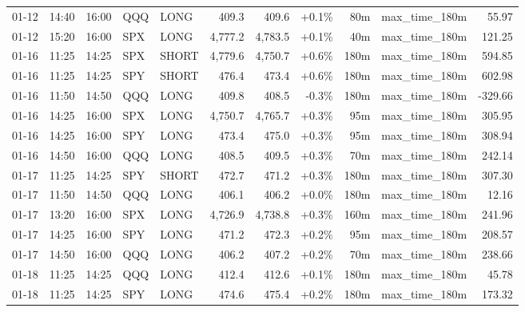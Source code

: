 \documentclass[11pt,a4paper,twoside]{article}
\begin{document}
\begin{center}
\begin{longtable}{>{\color{txtmain}}l l l l l r r r r >{\color{txtmain}}l r}
01-12 & 14:40 & 16:00 & QQQ & LONG & 409.3 & 409.6 & \textcolor{wingreen}{+0.1\%} & 80m & max\_time\_180m & \textcolor{wingreen}{55.97} \\
01-12 & 15:20 & 16:00 & SPX & LONG & 4,777.2 & 4,783.5 & \textcolor{wingreen}{+0.1\%} & 40m & max\_time\_180m & \textcolor{wingreen}{121.25} \\
01-16 & 11:25 & 14:25 & SPX & SHORT & 4,779.6 & 4,750.7 & \textcolor{wingreen}{+0.6\%} & 180m & max\_time\_180m & \textcolor{wingreen}{594.85} \\
01-16 & 11:25 & 14:25 & SPY & SHORT & 476.4 & 473.4 & \textcolor{wingreen}{+0.6\%} & 180m & max\_time\_180m & \textcolor{wingreen}{602.98} \\
01-16 & 11:50 & 14:50 & QQQ & LONG & 409.8 & 408.5 & \textcolor{lossred}{-0.3\%} & 180m & max\_time\_180m & \textcolor{lossred}{-329.66} \\
01-16 & 14:25 & 16:00 & SPX & LONG & 4,750.7 & 4,765.7 & \textcolor{wingreen}{+0.3\%} & 95m & max\_time\_180m & \textcolor{wingreen}{305.95} \\
01-16 & 14:25 & 16:00 & SPY & LONG & 473.4 & 475.0 & \textcolor{wingreen}{+0.3\%} & 95m & max\_time\_180m & \textcolor{wingreen}{308.94} \\
01-16 & 14:50 & 16:00 & QQQ & LONG & 408.5 & 409.5 & \textcolor{wingreen}{+0.3\%} & 70m & max\_time\_180m & \textcolor{wingreen}{242.14} \\
01-17 & 11:25 & 14:25 & SPY & SHORT & 472.7 & 471.2 & \textcolor{wingreen}{+0.3\%} & 180m & max\_time\_180m & \textcolor{wingreen}{307.30} \\
01-17 & 11:50 & 14:50 & QQQ & LONG & 406.1 & 406.2 & \textcolor{wingreen}{+0.0\%} & 180m & max\_time\_180m & \textcolor{wingreen}{12.16} \\
01-17 & 13:20 & 16:00 & SPX & LONG & 4,726.9 & 4,738.8 & \textcolor{wingreen}{+0.3\%} & 160m & max\_time\_180m & \textcolor{wingreen}{241.96} \\
01-17 & 14:25 & 16:00 & SPY & LONG & 471.2 & 472.3 & \textcolor{wingreen}{+0.2\%} & 95m & max\_time\_180m & \textcolor{wingreen}{208.57} \\
01-17 & 14:50 & 16:00 & QQQ & LONG & 406.2 & 407.2 & \textcolor{wingreen}{+0.2\%} & 70m & max\_time\_180m & \textcolor{wingreen}{238.66} \\
01-18 & 11:25 & 14:25 & QQQ & LONG & 412.4 & 412.6 & \textcolor{wingreen}{+0.1\%} & 180m & max\_time\_180m & \textcolor{wingreen}{45.78} \\
01-18 & 11:25 & 14:25 & SPY & LONG & 474.6 & 475.4 & \textcolor{wingreen}{+0.2\%} & 180m & max\_time\_180m & \textcolor{wingreen}{173.32} \\

\end{longtable}
\end{center}
\end{document}
